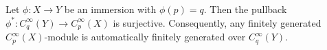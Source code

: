 Let $\phi: X \to Y$ be an immersion with $\phi(p) = q$. Then the pullback $\phi^*: C_q^\infty(Y) \to C_p^\infty(X)$ is surjective. Consequently, any finitely generated $C_p^\infty(X)$-module is automatically finitely generated over $C_q^\infty(Y)$.
